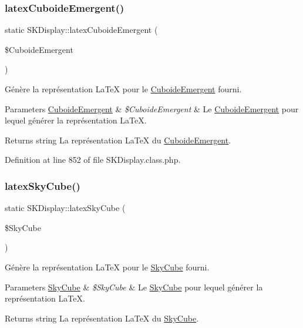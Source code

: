 \subsubsection{\texorpdfstring{latex\+Cuboide\+Emergent()}{latexCuboideEmergent()}}
{\footnotesize\ttfamily static S\+K\+Display\+::latex\+Cuboide\+Emergent (\begin{DoxyParamCaption}\item[{}]{\$\+Cuboide\+Emergent }\end{DoxyParamCaption})\hspace{0.3cm}{\ttfamily [static]}}

Génère la représentation La\+TeX pour le \hyperlink{class_cuboide_emergent}{Cuboide\+Emergent} fourni.


\begin{DoxyParams}[1]{Parameters}
\hyperlink{class_cuboide_emergent}{Cuboide\+Emergent} & {\em \$\+Cuboide\+Emergent} & Le \hyperlink{class_cuboide_emergent}{Cuboide\+Emergent} pour lequel générer la représentation La\+TeX. \\
\hline
\end{DoxyParams}
\begin{DoxyReturn}{Returns}
string La représentation La\+TeX du \hyperlink{class_cuboide_emergent}{Cuboide\+Emergent}. 
\end{DoxyReturn}


Definition at line 852 of file S\+K\+Display.\+class.\+php.

\mbox{\label{class_s_k_display_aefa8be0cd6ef68f76d974531cd7d0d83}} 
\subsubsection{\texorpdfstring{latex\+Sky\+Cube()}{latexSkyCube()}}
{\footnotesize\ttfamily static S\+K\+Display\+::latex\+Sky\+Cube (\begin{DoxyParamCaption}\item[{}]{\$\+Sky\+Cube }\end{DoxyParamCaption})\hspace{0.3cm}{\ttfamily [static]}}

Génère la représentation La\+TeX pour le \hyperlink{class_sky_cube}{Sky\+Cube} fourni.


\begin{DoxyParams}[1]{Parameters}
\hyperlink{class_sky_cube}{Sky\+Cube} & {\em \$\+Sky\+Cube} & Le \hyperlink{class_sky_cube}{Sky\+Cube} pour lequel générer la représentation La\+TeX. \\
\hline
\end{DoxyParams}
\begin{DoxyReturn}{Returns}
string La représentation La\+TeX du \hyperlink{class_sky_cube}{Sky\+Cube}. 
\end{DoxyReturn}


